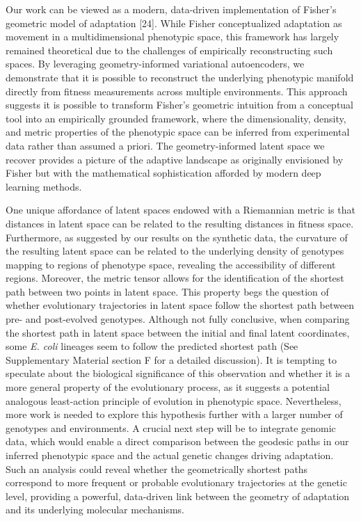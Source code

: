 \documentclass[
]{scrartcl}
\begin{document}
\begin{refsegment}
Our work can be viewed as a modern, data-driven implementation of
Fisher's geometric model of adaptation {[}24{]}. While Fisher
conceptualized adaptation as movement in a multidimensional phenotypic
space, this framework has largely remained theoretical due to the
challenges of empirically reconstructing such spaces. By leveraging
geometry-informed variational autoencoders, we demonstrate that it is
possible to reconstruct the underlying phenotypic manifold directly from
fitness measurements across multiple environments. This approach
suggests it is possible to transform Fisher's geometric intuition from a
conceptual tool into an empirically grounded framework, where the
dimensionality, density, and metric properties of the phenotypic space
can be inferred from experimental data rather than assumed a priori. The
geometry-informed latent space we recover provides a picture of the
adaptive landscape as originally envisioned by Fisher but with the
mathematical sophistication afforded by modern deep learning methods.

One unique affordance of latent spaces endowed with a Riemannian metric
is that distances in latent space can be related to the resulting
distances in fitness space. Furthermore, as suggested by our results on
the synthetic data, the curvature of the resulting latent space can be
related to the underlying density of genotypes mapping to regions of
phenotype space, revealing the accessibility of different regions.
Moreover, the metric tensor allows for the identification of the
shortest path between two points in latent space. This property begs the
question of whether evolutionary trajectories in latent space follow the
shortest path between pre- and post-evolved genotypes. Although not
fully conclusive, when comparing the shortest path in latent space
between the initial and final latent coordinates, some \emph{E. coli}
lineages seem to follow the predicted shortest path (See Supplementary
Material section F for a detailed discussion). It is tempting to
speculate about the biological significance of this observation and
whether it is a more general property of the evolutionary process, as it
suggests a potential analogous least-action principle of evolution in
phenotypic space. Nevertheless, more work is needed to explore this
hypothesis further with a larger number of genotypes and environments.
\textcolor{tempcolor}{ A crucial
next step will be to integrate genomic data, which would enable a direct
comparison between the geodesic paths in our inferred phenotypic space
and the actual genetic changes driving adaptation. Such an analysis
could reveal whether the geometrically shortest paths correspond to more
frequent or probable evolutionary trajectories at the genetic level,
providing a powerful, data-driven link between the geometry of
adaptation and its underlying molecular mechanisms. }


\end{refsegment}
\end{document}
